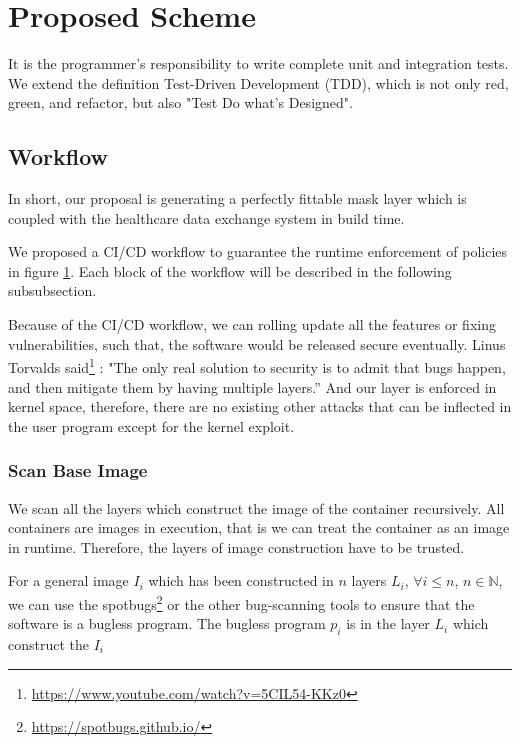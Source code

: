 \section{Proposed Scheme}
It is the programmer's responsibility to write complete unit and integration tests.
We extend the definition Test-Driven Development (TDD), which is not only red,
green, and refactor, but also "Test Do what's Designed".

\subsection{Workflow}
In short, our proposal is generating a perfectly fittable mask layer which
is coupled with the healthcare data exchange system in build time.

We proposed a CI/CD workflow to guarantee the runtime enforcement of policies
in figure \ref{fig:workflow}. Each block of the workflow will be described
in the following subsubsection.

Because of the CI/CD workflow, we can rolling update all the features or
fixing vulnerabilities, such that, the software would be released secure
eventually. Linus Torvalds said\footnote{\url{https://www.youtube.com/watch?v=5CIL54-KKz0}}
: "The only real solution to security is to admit that bugs happen, and
then mitigate them by having multiple layers.” And our layer is enforced
in kernel space, therefore, there are no existing other attacks that can
be inflected in the user program except for the kernel exploit.

\begin{figure}
    \centering
    \label{fig:workflow}
\end{figure}

\subsubsection{Scan Base Image}
We scan all the layers which construct the image of the container recursively.
All containers are images in execution, that is we can treat the container
as an image in runtime. Therefore, the layers of image construction have to
be trusted.

For a general image $I_i$ which has been constructed in $n$ layers $L_i$,
$\forall i \le n$, $n \in \mathbb{N}$, we can use the spotbugs\footnote{\url{https://spotbugs.github.io/}}
or the other bug-scanning tools to ensure that the software is a bugless program.
The bugless program $p_i$ is in the layer $L_i$ which construct the $I_i$

